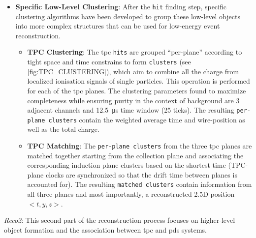 \begin{itemize}
    \item \textbf{Specific Low-Level Clustering}: After the \texttt{hit} finding step, specific clustering algorithms have been developed to group these low-level objects into more complex structures that can be used for low-energy event reconstruction.
    
    \begin{itemize}
        \item \textbf{TPC Clustering}: The \gls{tpc} \texttt{hits} are grouped ``per-plane'' according to tight space and time constrains to form \texttt{clusters} (see \cref{fig:TPC_CLUSTERING}), which aim to combine all the charge from localized ionisation signals of single particles. This operation is performed for each of the \gls{tpc} planes. The clustering parameters found to maximize completeness while ensuring purity in the context of background are \num{3} adjacent channels and \SI{12.5}{\micro\second} time window (25 ticks). The resulting \texttt{per-plane clusters} contain the weighted average time and wire-position as well as the total charge.
        \item \textbf{TPC Matching}: The \texttt{per-plane clusters} from the three \gls{tpc} planes are matched together starting from the collection plane and associating the corresponding induction plane clusters based on the shortest time (TPC-plane clocks are synchronized so that the drift time between planes is accounted for). The resulting \texttt{matched clusters} contain information from all three planes and most importantly, a reconstructed 2.5D position $<t,y,z>$.
    \end{itemize}
\end{itemize}
\fi

\emph{Reco2}: This second part of the reconstruction process focuses on higher-level object formation and the association between \gls{tpc} and \gls{pds} systems.

